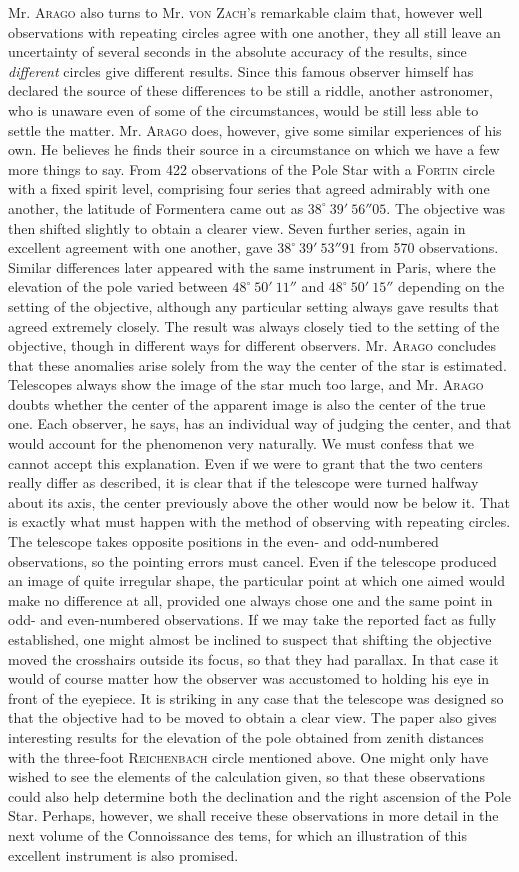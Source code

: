 Mr. \textsc{Arago} also turns to Mr. \textsc{von Zach}'s remarkable claim that, however well observations with repeating circles agree with one another, they all still leave an uncertainty of several seconds in the absolute accuracy of the results, since \emph{different} circles give different results. Since this famous observer himself has declared the source of these differences to be still a riddle, another astronomer, who is unaware even of some of the circumstances, would be still less able to settle the matter. Mr. \textsc{Arago} does, however, give some similar experiences of his own. He believes he finds their source in a circumstance on which we have a few more things to say. From 422 observations of the Pole Star with a \textsc{Fortin} circle with a fixed spirit level, comprising four series that agreed admirably with one another, the latitude of Formentera came out as $38^\circ\ 39'\ 56''05$. The objective was then shifted slightly to obtain a clearer view. Seven further series, again in excellent agreement with one another, gave $38^\circ\ 39'\ 53''91$ from 570 observations. Similar differences later appeared with the same instrument in Paris, where the elevation of the pole varied between $48^\circ\ 50'\ 11''$ and $48^\circ\ 50'\ 15''$ depending on the setting of the objective, although any particular setting always gave results that agreed extremely closely. The result was always closely tied to the setting of the objective, though in different ways for different observers. Mr. \textsc{Arago} concludes that these anomalies arise solely from the way the center of the star is estimated. Telescopes always show the image of the star much too large, and Mr. \textsc{Arago} doubts whether the center of the apparent image is also the center of the true one. Each observer, he says, has an individual way of judging the center, and that would account for the phenomenon very naturally. We must confess that we cannot accept this explanation. Even if we were to grant that the two centers really differ as described, it is clear that if the telescope were turned halfway about its axis, the center previously above the other would now be below it. That is exactly what must happen with the method of observing with repeating circles. The telescope takes opposite positions in the even- and odd-numbered observations, so the pointing errors must cancel. Even if the telescope produced an image of quite irregular shape, the particular point at which one aimed would make no difference at all, provided one always chose one and the same point in odd- and even-numbered observations. If we may take the reported fact as fully established, one might almost be inclined to suspect that shifting the objective moved the crosshairs outside its focus, so that they had parallax. In that case it would of course matter how the observer was accustomed to holding his eye in front of the eyepiece. It is striking in any case that the telescope was designed so that the objective had to be moved to obtain a clear view. The paper also gives interesting results for the elevation of the pole obtained from zenith distances with the three-foot \textsc{Reichenbach} circle mentioned above. One might only have wished to see the elements of the calculation given, so that these observations could also help determine both the declination and the right ascension of the Pole Star. Perhaps, however, we shall receive these observations in more detail in the next volume of the Connoissance des tems, for which an illustration of this excellent instrument is also promised.

